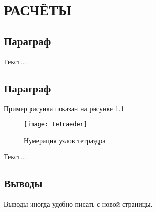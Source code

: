 \chapter{РАСЧЁТЫ}

\section[Параграф]{Параграф}


Текст...


\section{Параграф}


Пример рисунка показан на рисунке \ref{fig:tetraeder}.

\begin{figure}[h!]
\begin{center}
\texttt{[image: tetraeder]}\\[2mm]
\caption{Нумерация узлов тетраэдра}\label{fig:tetraeder}
\end{center}
\end{figure}

Текст...

\newpage
\section*{Выводы}

Выводы иногда удобно писать с новой страницы.